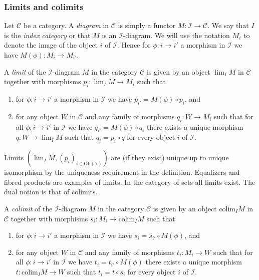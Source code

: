 \subsubsection{Limits and colimits}
\label{subsubsection-limits}

\noindent
Let $\mathcal{C}$ be a category. A {\it diagram} in $\mathcal{C}$ is
simply a functor $M : \mathcal{I} \to \mathcal{C}$. We say that
$I$ is the {\it index category} or that $M$ is an $\mathcal{I}$-diagram.
We will use the notation $M_i$ to denote the image of the object
$i$ of $\mathcal{I}$. Hence for $\phi : i \to i'$ a morphism
in $\mathcal{I}$ we have $M(\phi) : M_i \to M_{i'}$.

\begin{definition}
\label{definition-limit}
A {\it limit} of the $\mathcal{I}$-diagram $M$ in the category
$\mathcal{C}$ is given by an object $\lim_I M$ in $\mathcal{C}$
together with morphisms $p_i : \lim_I M \to M_i$ such that
\begin{enumerate}
\item for $\phi : i \to i'$ a morphism
in $\mathcal{I}$ we have $p_{i'} =  M(\phi) \circ p_i$, and
\item for any object $W$ in $\mathcal{C}$ and any family of
morphisms $q_i : W \to M_i$ such that for all $\phi : i \to i'$
in $\mathcal{I}$ we have $q_{i'} = M(\phi) \circ q_i$ there 
exists a unique morphism $q : W \to \lim_I M$ such that
$q_i = p_i \circ q$ for every object $i$ of $\mathcal{I}$.
\end{enumerate}
\end{definition}

\noindent
Limits $(\lim_I M, (p_i)_{i\in \text{Ob}(\mathcal{I})})$ are
(if they exist)
unique up to unique isomorphism by the uniqueness requirement
in the definition. Equalizers and fibred products are examples
of limits. In the category of sets all limits exist.
The dual notion is that of colimits.

\begin{definition}
\label{definition-colimit}
A {\it colimit} of the $\mathcal{I}$-diagram $M$ in the category
$\mathcal{C}$ is given by an object $\text{colim}_I M$ in $\mathcal{C}$
together with morphisms $s_i : M_i \to \text{colim}_I M$ such that
\begin{enumerate}
\item for $\phi : i \to i'$ a morphism
in $\mathcal{I}$ we have $s_{i} = s_{i'} \circ M(\phi)$, and
\item for any object $W$ in $\mathcal{C}$ and any family of
morphisms $t_i : M_i \to W$ such that for all $\phi : i \to i'$
in $\mathcal{I}$ we have $t_{i} = t_{i'} \circ M(\phi)$ there 
exists a unique morphism $t : \text{colim}_I M \to W$ such that
$t_i = t \circ s_i$ for every object $i$ of $\mathcal{I}$.
\end{enumerate}
\end{definition}

